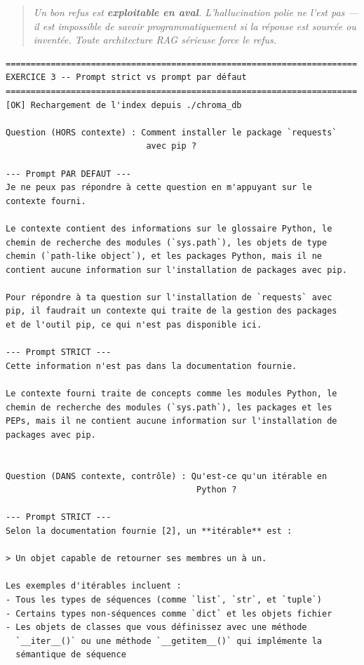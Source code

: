 \documentclass[11pt,a4paper]{article}
\begin{document}
\begin{quote}\itshape
Un bon refus est \textbf{exploitable en aval}. L'hallucination polie ne
l'est pas — il est impossible de savoir programmatiquement si la
réponse est sourcée ou inventée. Toute architecture RAG sérieuse force
le refus.
\end{quote}

\begin{tcolorbox}[
  colback=white,
  colframe=black!50,
  coltitle=black,
  fonttitle=\footnotesize\bfseries,
  fontupper=\footnotesize,
  title=Sortie de l'exécution,
  breakable,
]
\begin{verbatim}
======================================================================
EXERCICE 3 -- Prompt strict vs prompt par défaut
======================================================================
[OK] Rechargement de l'index depuis ./chroma_db

Question (HORS contexte) : Comment installer le package `requests`
                            avec pip ?

--- Prompt PAR DEFAUT ---
Je ne peux pas répondre à cette question en m'appuyant sur le
contexte fourni.

Le contexte contient des informations sur le glossaire Python, le
chemin de recherche des modules (`sys.path`), les objets de type
chemin (`path-like object`), et les packages Python, mais il ne
contient aucune information sur l'installation de packages avec pip.

Pour répondre à ta question sur l'installation de `requests` avec
pip, il faudrait un contexte qui traite de la gestion des packages
et de l'outil pip, ce qui n'est pas disponible ici.

--- Prompt STRICT ---
Cette information n'est pas dans la documentation fournie.

Le contexte fourni traite de concepts comme les modules Python, le
chemin de recherche des modules (`sys.path`), les packages et les
PEPs, mais il ne contient aucune information sur l'installation de
packages avec pip.


Question (DANS contexte, contrôle) : Qu'est-ce qu'un itérable en
                                      Python ?

--- Prompt STRICT ---
Selon la documentation fournie [2], un **itérable** est :

> Un objet capable de retourner ses membres un à un.

Les exemples d'itérables incluent :
- Tous les types de séquences (comme `list`, `str`, et `tuple`)
- Certains types non-séquences comme `dict` et les objets fichier
- Les objets de classes que vous définissez avec une méthode
  `__iter__()` ou une méthode `__getitem__()` qui implémente la
  sémantique de séquence


\end{verbatim}
\end{tcolorbox}
\end{document}

